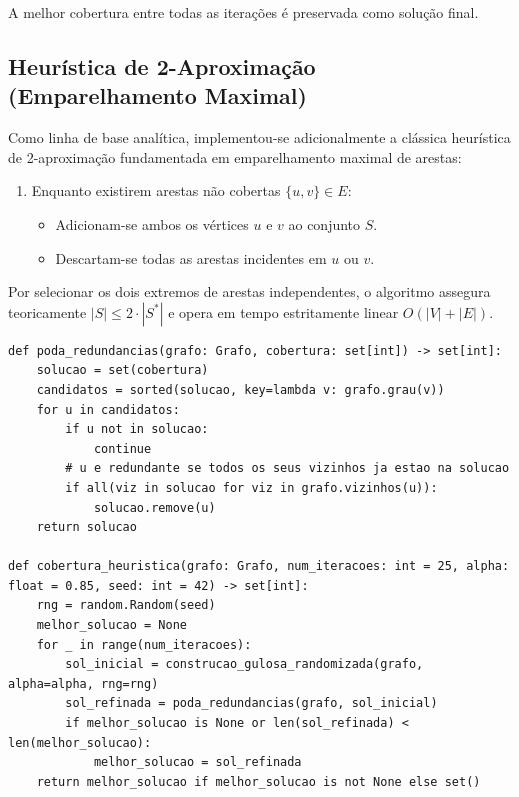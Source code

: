 \documentclass[12pt,a4paper]{article}
\begin{document}
A melhor cobertura entre todas as iterações é preservada como solução final.

\subsection{Heurística de 2-Aproximação (Emparelhamento Maximal)}
Como linha de base analítica, implementou-se adicionalmente a clássica heurística de 2-aproximação fundamentada em emparelhamento maximal de arestas:
\begin{enumerate}
    \item Enquanto existirem arestas não cobertas $\{u, v\} \in E$:
    \begin{itemize}
        \item Adicionam-se ambos os vértices $u$ e $v$ ao conjunto $S$.
        \item Descartam-se todas as arestas incidentes em $u$ ou $v$.
    \end{itemize}
\end{enumerate}
Por selecionar os dois extremos de arestas independentes, o algoritmo assegura teoricamente $|S| \le 2 \cdot |S^*|$ e opera em tempo estritamente linear $O(|V| + |E|)$.

\begin{lstlisting}[caption={Trecho Central do Módulo \texttt{cobertura.py}}, label={cod:cobertura}]
def poda_redundancias(grafo: Grafo, cobertura: set[int]) -> set[int]:
    solucao = set(cobertura)
    candidatos = sorted(solucao, key=lambda v: grafo.grau(v))
    for u in candidatos:
        if u not in solucao:
            continue
        # u e redundante se todos os seus vizinhos ja estao na solucao
        if all(viz in solucao for viz in grafo.vizinhos(u)):
            solucao.remove(u)
    return solucao

def cobertura_heuristica(grafo: Grafo, num_iteracoes: int = 25, alpha: float = 0.85, seed: int = 42) -> set[int]:
    rng = random.Random(seed)
    melhor_solucao = None
    for _ in range(num_iteracoes):
        sol_inicial = construcao_gulosa_randomizada(grafo, alpha=alpha, rng=rng)
        sol_refinada = poda_redundancias(grafo, sol_inicial)
        if melhor_solucao is None or len(sol_refinada) < len(melhor_solucao):
            melhor_solucao = sol_refinada
    return melhor_solucao if melhor_solucao is not None else set()
\end{lstlisting}

\end{document}
